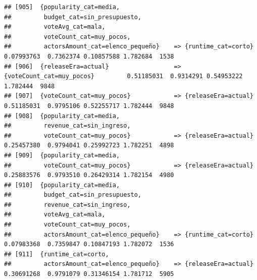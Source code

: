 \documentclass[
]{article}
\begin{document}
\begin{verbatim}
## [905]  {popularity_cat=media,                                                                                                   
##         budget_cat=sin_presupuesto,                                                                                             
##         voteAvg_cat=mala,                                                                                                       
##         voteCount_cat=muy_pocos,                                                                                                
##         actorsAmount_cat=elenco_pequeño}    => {runtime_cat=corto}               0.07993763  0.7362374 0.10857588 1.782684  1538
## [906]  {releaseEra=actual}                  => {voteCount_cat=muy_pocos}         0.51185031  0.9314291 0.54953222 1.782444  9848
## [907]  {voteCount_cat=muy_pocos}            => {releaseEra=actual}               0.51185031  0.9795106 0.52255717 1.782444  9848
## [908]  {popularity_cat=media,                                                                                                   
##         revenue_cat=sin_ingreso,                                                                                                
##         voteCount_cat=muy_pocos}            => {releaseEra=actual}               0.25457380  0.9794041 0.25992723 1.782251  4898
## [909]  {popularity_cat=media,                                                                                                   
##         voteCount_cat=muy_pocos}            => {releaseEra=actual}               0.25883576  0.9793510 0.26429314 1.782154  4980
## [910]  {popularity_cat=media,                                                                                                   
##         budget_cat=sin_presupuesto,                                                                                             
##         revenue_cat=sin_ingreso,                                                                                                
##         voteAvg_cat=mala,                                                                                                       
##         voteCount_cat=muy_pocos,                                                                                                
##         actorsAmount_cat=elenco_pequeño}    => {runtime_cat=corto}               0.07983368  0.7359847 0.10847193 1.782072  1536
## [911]  {runtime_cat=corto,                                                                                                      
##         actorsAmount_cat=elenco_pequeño}    => {releaseEra=actual}               0.30691268  0.9791079 0.31346154 1.781712  5905

\end{verbatim}
\end{document}
